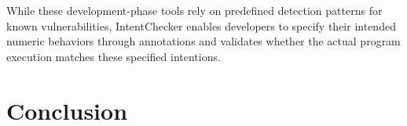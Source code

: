 \documentclass[pdflatex,sn-basic]{sn-jnl}%
\theoremstyle{thmstyleone}%
\theoremstyle{thmstyletwo}%
\theoremstyle{thmstylethree}%
\begin{document}
While these development-phase tools rely on predefined detection patterns for known vulnerabilities,
IntentChecker enables developers to specify their intended numeric behaviors through annotations and validates whether the actual program execution matches these specified intentions.

\section{Conclusion}\label{sec:conclusion}
\newif\ifshowack
\showackfalse

\ifshowack
  \section*{Acknowledgment}
\fi
\end{document}
